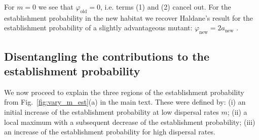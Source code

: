 \documentclass[11pt]{article}
\newcommand{\chg}[1]{\textcolor{change}{#1}}
\begin{document}
\chg{For $m=0$ we see that $\varphi_{\text{old}}=0$, i.e. terms (1) and (2) cancel out. For the establishment probability in the new habitat we recover Haldane's result for the establishment probability of a slightly advantageous mutant: $\varphi_{\text{new}}=2a_{\text{new}}$ \citep{haldane_1927}.}

\subsection{Disentangling the contributions to the establishment probability}
\chg{We now proceed to explain} the three regions of the establishment probability from Fig.~\ref{fig:vary_m_est}(a) in the main text. These were defined by: (i) an initial increase of the establishment probability at low dispersal rates $m$; (ii) a local maximum with a subsequent decrease of the establishment probability; (iii) an increase of the establishment probability for high dispersal rates. 
\end{document}
